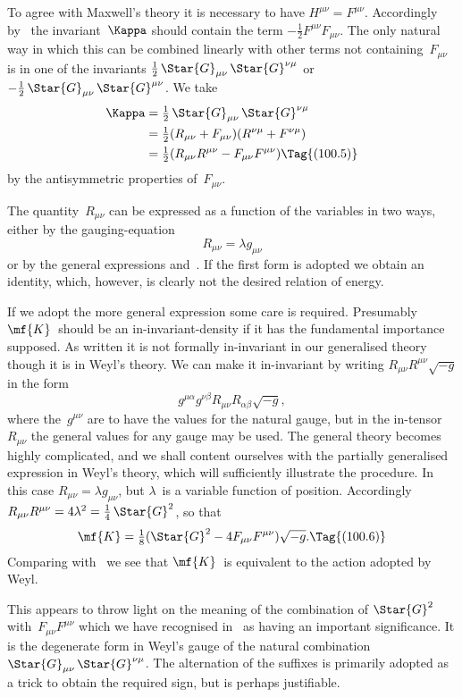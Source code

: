 \documentclass[12pt]{book}
\begin{document}
To agree with Maxwell's theory it is necessary to have $H^{\mu\nu} = F^{\mu\nu}$. Accordingly
by~ the invariant~$\Kappa$ should contain the term $-\frac{1}{2}F^{\mu\nu} F_{\mu\nu}$.
The only natural way in which this can be combined linearly with other
terms not containing~$F_{\mu\nu}$ is in one of the invariants $\frac{1}{2}\, \Star{G}_{\mu\nu}\, \Star{G}^{\nu\mu}$ or  $-\frac{1}{2}\, \Star{G}_{\mu\nu}\, \Star{G}^{\mu\nu}$.
We take
\begin{align*}
\Kappa &= \tfrac{1}{2}\, \Star{G}_{\mu\nu}\, \Star{G}^{\nu\mu} \\
&= \tfrac{1}{2} (R_{\mu\nu} + F_{\mu\nu})(R^{\nu\mu} + F^{\nu\mu}) \\
&= \tfrac{1}{2} (R_{\mu\nu} R^{\mu\nu} - F_{\mu\nu} F^{\mu\nu})
\Tag{(100.5)}
\end{align*}
by the antisymmetric properties of~$F_{\mu\nu}$.

The quantity~$R_{\mu\nu}$ can be expressed as a function of the variables in two
ways, either by the gauging-equation
\[
R_{\mu\nu} = \lambda g_{\mu\nu}
\]
or by the general expressions  and~. If the first form is adopted
we obtain an identity, which, however, is clearly not the desired relation of
energy.

If we adopt the more general expression some care is required. Presumably
$\mf{K}$~should be an in-invariant-density if it has the fundamental
importance supposed. As written it is not formally in-invariant in our
generalised theory though it is in Weyl's theory. We can make it in-invariant
by writing $R_{\mu\nu} R^{\mu\nu} \sqrt{-g}$ in the form
\[
g^{\mu\alpha} g^{\nu\beta} R_{\mu\nu} R_{\alpha\beta} \sqrt{-g},
\]
where the~$g^{\mu\nu}$ are to have the values for the natural gauge, but in the in-tensor~$R_{\mu\nu}$
the general values for any gauge may be used. The general theory
becomes highly complicated, and we shall content ourselves with the partially
generalised expression in Weyl's theory, which will sufficiently illustrate the
procedure. In this case $R_{\mu\nu} = \lambda g_{\mu\nu}$, but $\lambda$~is a variable function of position.
Accordingly $R_{\mu\nu} R^{\mu\nu} = 4\lambda^{2} = \frac{1}{4}\, \Star{G}^{2}$, so that
\[
\mf{K} = \tfrac{1}{8}(\Star{G}^{2} - 4F_{\mu\nu} F^{\mu\nu}) \sqrt{-g}.
\Tag{(100.6)}
\]
Comparing with~ we see that $\mf{K}$~is equivalent to the action adopted by
%
Weyl.

This appears to throw light on the meaning of the combination of $\Star{G}^{2}$
with~$F_{\mu\nu} F^{\mu\nu}$ which we have recognised in~ as having an important
significance. It is the degenerate form in Weyl's gauge of the natural combination
$\Star{G}_{\mu\nu}\, \Star{G}^{\nu\mu}$. The alternation of the suffixes is primarily adopted as a
trick to obtain the required sign, but is perhaps justifiable.
\end{document}
